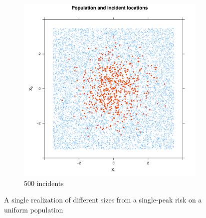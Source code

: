 \begin{figure}[htbp]
\begin{subfigure}{0.45\textwidth}
    \includegraphics[width=\textwidth]{results/unif_500_1_1h/output/population_and_incidents_scatter}
    \caption{500 incidents}
    \end{subfigure}
    \caption{A single realization of different sizes from a single-peak risk on a uniform population}
    \label{fig:one_sample:unif_NCases_1h}
\end{figure}

